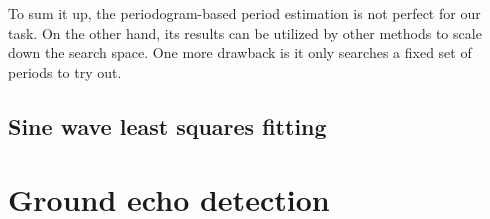 To sum it up, the periodogram-based period estimation is not perfect for our task. On the other hand, its results can be utilized by other methods to scale down the search space. One more drawback is it only searches a fixed set of periods to try out.

\subsection{Sine wave least squares fitting}

 
\section{Ground echo detection}















